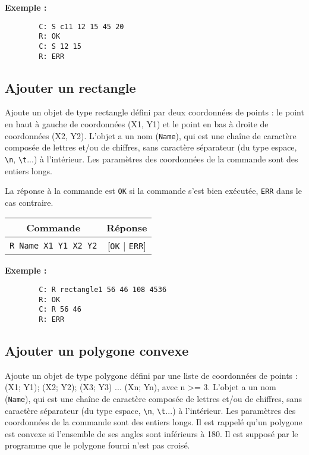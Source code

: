 \documentclass[11pt,a4paper]{article}
\begin{document}
	\textbf{Exemple :}
	\begin{verbatim}
		C: S c11 12 15 45 20
		R: OK
		C: S 12 15
		R: ERR
	\end{verbatim}
	
	\subsection{Ajouter un rectangle}
	Ajoute un objet de type rectangle défini par deux coordonnées de points : le point en haut à gauche de coordonnées (X1, Y1) et le point en bas à droite de coordonnées (X2, Y2). L'objet a un nom (\texttt{Name}), qui est une chaîne de caractère composée de lettres et/ou de chiffres, sans caractère séparateur (du type espace, \texttt{\textbackslash n}, \texttt{\textbackslash t}...) à l'intérieur. Les paramètres des coordonnées de la commande sont des entiers longs.
	
	La réponse à la commande est \texttt{OK} si la commande s'est bien exécutée, \texttt{ERR} dans le cas contraire.
	
	\begin{center}
		\begin{tabular}[c]{|c | c|}
			\hline
			\textbf{Commande} & \textbf{Réponse} \\
			\hline
			\texttt{R Name X1 Y1 X2 Y2} & [\texttt{OK} | \texttt{ERR}] \\
			\hline
		\end{tabular}
	\end{center}
	
	\textbf{Exemple :}
	\begin{verbatim}
		C: R rectangle1 56 46 108 4536
		R: OK
		C: R 56 46
		R: ERR
	\end{verbatim}
	
	\subsection{Ajouter un polygone convexe}
	Ajoute un objet de type polygone défini par une liste de coordonnées de points : (X1; Y1); (X2; Y2); (X3; Y3) ... (Xn; Yn), avec n >= 3. L'objet a un nom (\texttt{Name}), qui est une chaîne de caractère composée de lettres et/ou de chiffres, sans caractère séparateur (du type espace, \texttt{\textbackslash n}, \texttt{\textbackslash t}...) à l'intérieur. Les paramètres des coordonnées de la commande sont des entiers longs. Il est rappelé qu’un polygone est convexe si l'ensemble de ses angles sont inférieurs à 180\degree. Il est supposé par le programme que le polygone fourni n'est pas croisé.
	
\end{document}
